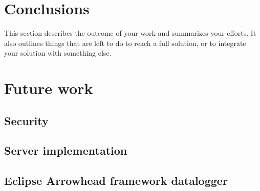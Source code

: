 \section{Conclusions}
This section describes the outcome of your work and summarizes your efforts. It also outlines things that are left to do to reach a full solution, or to integrate your solution with something else.
\section{Future work}
\subsection{Security}
\subsection{Server implementation}
\subsection{Eclipse Arrowhead framework datalogger}
